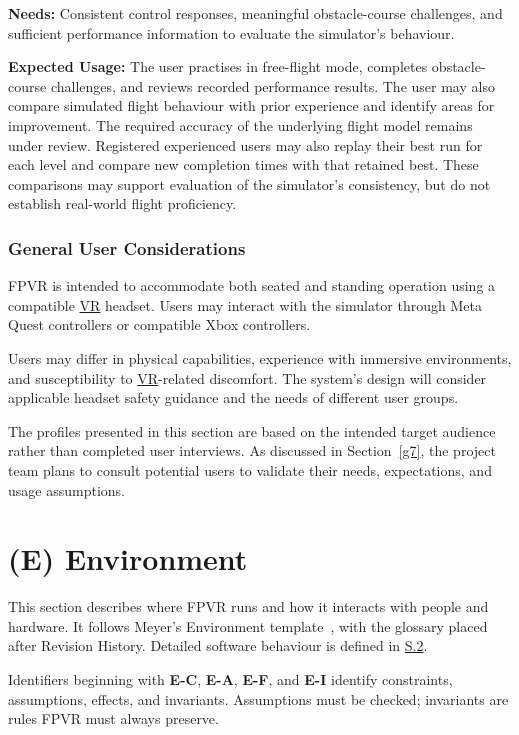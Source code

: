 \documentclass[12pt]{article}
\newcommand{\unumbered}[1]{%
  \phantomsection\section*{#1}\addcontentsline{toc}{section}{#1}}
\newcommand{\booksection}[2]{%
  \clearpage\unumbered{(#1) #2}
  \renewcommand{\thesubsection}{#1.\arabic{subsection}}
  \renewcommand{\theHsubsection}{#1.\arabic{subsection}}
  \setcounter{subsection}{0}}
\begin{document}
\noindent\textbf{Needs:}
Consistent control responses, meaningful
obstacle-course challenges, and sufficient
performance information to evaluate the
simulator's behaviour.

\noindent\textbf{Expected Usage:}
The user practises in free-flight mode,
completes obstacle-course challenges, and
reviews recorded performance results.
The user may also compare simulated flight
behaviour with prior experience and identify
areas for improvement. The required accuracy
of the underlying flight model remains
under review.
Registered experienced users may also replay their best run for each level
and compare new completion times with that retained best. These comparisons
may support evaluation of the simulator's
consistency, but do not establish real-world
flight proficiency.



\subsubsection{General User Considerations}
\label{sec:general-user-considerations}

FPVR is intended to accommodate both seated and
standing operation using a compatible \hyperlink{glos:VR}{VR} headset.
Users may interact with the simulator through
Meta Quest controllers or compatible Xbox
controllers.

Users may differ in physical capabilities,
experience with immersive environments, and
susceptibility to \hyperlink{glos:VR}{VR}-related discomfort.
The system's design will consider applicable
headset safety guidance and the needs of
different user groups.

The profiles presented in this section are
based on the intended target audience rather
than completed user interviews. As discussed
in Section~\ref{g7},
the project team plans to consult potential
users to validate their needs, expectations,
and usage assumptions.



\booksection{E}{Environment}

This section describes where FPVR runs and how it interacts with people and
hardware. It follows Meyer's Environment template~\cite{BM22}, with the glossary
placed after Revision History. Detailed software behaviour is defined in
\hyperref[s2]{S.2}.

Identifiers beginning with \textbf{E-C}, \textbf{E-A}, \textbf{E-F}, and
\textbf{E-I} identify constraints, assumptions, effects, and invariants.
Assumptions must be checked; invariants are rules FPVR must always preserve.
\end{document}
